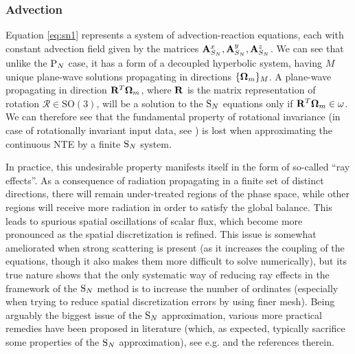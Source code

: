 \subsubsection{Advection}\label{sec:SN_advection}
Equation \eqref{eq:sn1} represents a system of advection-reaction equations, each with constant advection field given by
the matrices $\mathbf{A}_{S_N}^x, \mathbf{A}_{S_N}^y, \mathbf{A}_{S_N}^z$. We can see that unlike the $\text{P}_{N}$ case, it has a
form of a decoupled hyperbolic system, having $M$ unique plane-wave solutions propagating in directions $\{\mathbf{\Omega}_m\}_{M}$. A
plane-wave propagating in direction $\mathbf{R}^T\mathbf{\Omega}_m$, where $\mathbf{R}$ is the matrix representation of rotation
$\mathcal{R}\in \mathrm{SO}(3)$, will be a solution to the $\text{S}_{N}$ equations only if $\mathbf{R}^T\mathbf{\Omega}_m \in \omega$. We
can therefore see that the fundamental property of rotational invariance (in case of rotationally invariant input data,
see ) is lost when approximating the continuous NTE by a finite $\text{S}_{N}$ system.

In practice, this undesirable property manifests itself in the form of so-called ``ray effects''. As a consequence of
radiation propagating in a finite set of distinct directions, there will remain under-treated regions of the phase
space, while other regions will receive more radiation in order to satisfy the global balance. This leads to spurious spatial oscillations
of scalar flux, which become more pronounced as the spatial discretization is refined.
This issue is somewhat ameliorated when strong scattering is present (as it increases the coupling of the equations,
though it also makes them more difficult to solve numerically), but its true nature shows that the only systematic way
of reducing ray effects in the framework of the $\text{S}_{N}$ method is to increase the number of ordinates (especially when
trying to reduce spatial discretization errors by using finer mesh). Being arguably the biggest issue of the $\text{S}_{N}$ approximation, various more practical
remedies have been proposed in literature (which, as expected, typically sacrifice some properties of the $\text{S}_{N}$
approximation), see e.g. \cite{Li1} and the references therein.

